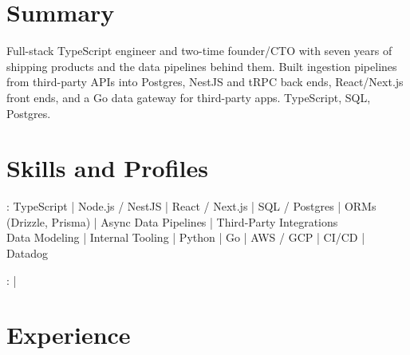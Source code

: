 \documentclass[print]{jack-resume}
\begin{document}
\pagecolor{darkmodeBackground}


\begin{minipage}[t][1cm][t]{.03\textwidth}
    \hfill
\end{minipage}

\section{Summary}
Full-stack TypeScript engineer and two-time founder/CTO with seven years of shipping products and the data pipelines behind them. Built ingestion pipelines from third-party APIs into Postgres, NestJS and tRPC back ends, React/Next.js front ends, and a Go data gateway for third-party apps. TypeScript, SQL, Postgres.
\sectionsep

\section{Skills and Profiles}
:
TypeScript \hfill | \hfill
Node.js / NestJS \hfill | \hfill
React / Next.js \hfill | \hfill
SQL / Postgres \hfill | \hfill
ORMs (Drizzle, Prisma) \hfill | \hfill
Async Data Pipelines \hfill | \hfill
Third-Party Integrations \\
\hspace{1.0cm} Data Modeling \hfill | \hfill
Internal Tooling \hfill | \hfill
Python \hfill | \hfill
Go \hfill | \hfill
AWS / GCP \hfill | \hfill
CI/CD \hfill | \hfill
Datadog \\

\raggedright{
    :
      \href{https://www.linkedin.com/in/jack-sturtevant/}{ \ExternalLink} |
     \href{https://github.com/jacksturt}{ \ExternalLink}}

\section{Experience}
\end{document}
